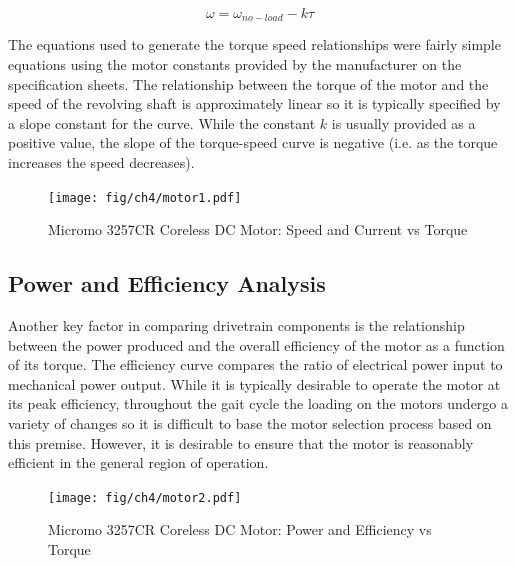 \begin{equation}
	\omega = \omega_{no-load} - k\tau
\end{equation}

The equations used to generate the torque speed relationships were fairly simple equations using the motor constants provided by the manufacturer on the specification sheets. The relationship between the torque of the motor and the speed of the revolving shaft is approximately linear so it is typically specified by a slope constant for the curve. While the constant $k$ is usually provided as a positive value, the slope of the torque-speed curve is negative (i.e. as the torque increases the speed decreases). 

\begin{figure}[!ht]
	\begin{center}
    \texttt{[image: fig/ch4/motor1.pdf]}
	\end{center}
  \caption{Micromo 3257CR Coreless DC Motor: Speed and Current vs Torque}
\end{figure}


\subsection{Power and Efficiency Analysis} %
\label{sub:power_and_efficiency_analysis}
Another key factor in comparing drivetrain components is the relationship between the power produced and the overall efficiency of the motor as a function of its torque. The efficiency curve compares the ratio of electrical power input to mechanical power output. While it is typically desirable to operate the motor at its peak efficiency, throughout the gait cycle the loading on the motors undergo a variety of changes so it is difficult to base the motor selection process based on this premise. However, it is desirable to ensure that the motor is reasonably efficient in the general region of operation. 


\begin{figure}[!ht]
	\begin{center}
    \texttt{[image: fig/ch4/motor2.pdf]}
	\end{center}
  \caption{Micromo 3257CR Coreless DC Motor: Power and Efficiency vs Torque}
\end{figure}


